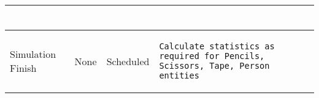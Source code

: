 \begin{longtable}{@{}>{\raggedright\arraybackslash}p{1.5cm}>{\raggedright\arraybackslash}p{2.1cm}>{\raggedright\arraybackslash}p{2.2cm}>{\raggedright\arraybackslash}p{10cm}@{}}
\begin{lstlisting}[language=CMPseudo]
  \end{lstlisting}
  \\ \midrule
  Simulation Finish & None  & Scheduled  & 
  \begin{lstlisting}[language=CMPseudo]
Calculate statistics as required for Pencils, Scissors, Tape, Person entities
  \end{lstlisting}
  \\ \bottomrule
  \end{longtable}